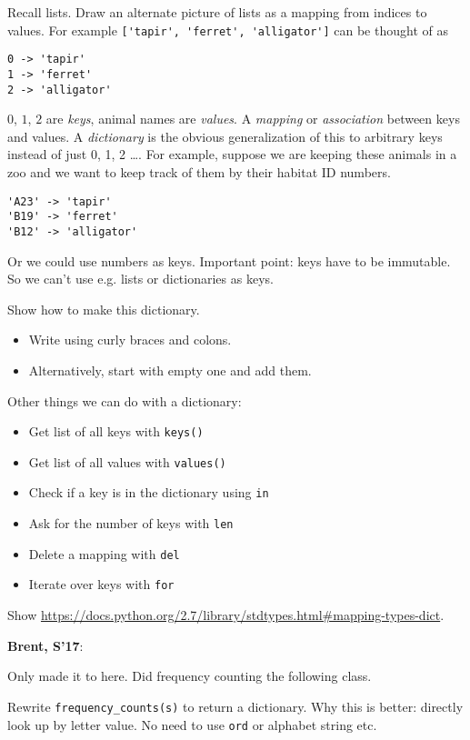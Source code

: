 \documentclass{article}
\newenvironment{reflect}[1]
{
  \noindent
  \begin{lrbox}{\reflectbox}
    \begin{minipage}[t]{\textwidth}
      \textbf{#1}:
}{
    \end{minipage}
  \end{lrbox}
  \fbox{\usebox{\reflectbox}}
}
\begin{document}
Recall lists.  Draw an alternate picture of lists as a mapping from
indices to values. For example \verb|['tapir', 'ferret', 'alligator']|
can be thought of as
\begin{verbatim}
0 -> 'tapir'
1 -> 'ferret'
2 -> 'alligator'
\end{verbatim}
$0$, $1$, $2$ are \emph{keys}, animal names are \emph{values}.  A
\emph{mapping} or \emph{association} between keys and values.  A
\emph{dictionary} is the obvious generalization of this to arbitrary
keys instead of just 0, 1, 2 \dots.  For example, suppose we are
keeping these animals in a zoo and we want to keep track of them by
their habitat ID numbers.
\begin{verbatim}
'A23' -> 'tapir'
'B19' -> 'ferret'
'B12' -> 'alligator'
\end{verbatim}
Or we could use numbers as keys.  Important point: keys have to be
immutable.  So we can't use e.g. lists or dictionaries as keys.

Show how to make this dictionary.
\begin{itemize}
\item Write using curly braces and colons.
\item Alternatively, start with empty one and add them.
\end{itemize}

Other things we can do with a dictionary:
\begin{itemize}
\item Get list of all keys with \verb|keys()|
\item Get list of all values with \verb|values()|
\item Check if a key is in the dictionary using \verb|in|
\item Ask for the number of keys with \verb|len|
\item Delete a mapping with \verb|del|
\item Iterate over keys with \verb|for|
\end{itemize}

Show
\url{https://docs.python.org/2.7/library/stdtypes.html#mapping-types-dict}.

\begin{reflect}{Brent, S'17}
  Only made it to here.  Did frequency counting the following class.
\end{reflect}

Rewrite \verb|frequency_counts(s)| to return a dictionary.  Why this is
better: directly look up by letter value.  No need to use \verb|ord|
or alphabet string etc.
\end{document}
